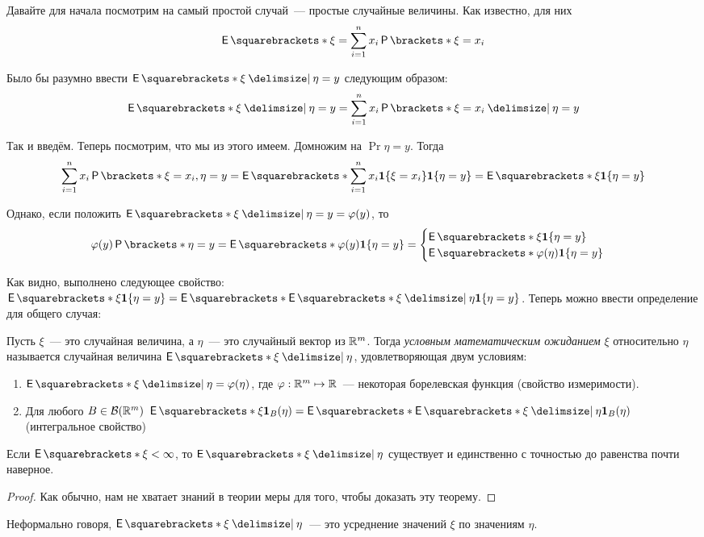Давайте для начала посмотрим на самый простой случай~--- простые случайные величины. Как известно, для них
\[
	\E{\xi} = \sum_{i = 1}^{n} x_i\Pr{\xi = x_i}
\]

Было бы разумно ввести \(\E{\xi \given \eta = y}\) следующим образом:
\[
	\E{\xi \given \eta = y} = \sum_{i = 1}^{n} x_i\Pr{\xi = x_i \given \eta = y}
\]

Так и введём. Теперь посмотрим, что мы из этого имеем. Домножим на \(\Pr{\eta = y}\). Тогда
\begin{align*}
	\sum_{i = 1}^{n} x_i\Pr{\xi = x_i, \eta = y} = \E{\sum_{i = 1}^{n} x_i\mathbf{1}\{\xi = x_i\}\mathbf{1}\{\eta = y\}} = \E{\xi\mathbf{1}\{\eta = y\}}
\end{align*}

Однако, если положить \(\E{\xi \given \eta = y} = \phi(y)\), то
\[
	\phi(y)\Pr{\eta = y} = \E{\phi(y)\mathbf{1}\{\eta = y\}} = \begin{cases}
	\E{\xi\mathbf{1}\{\eta = y\}} \\
	\E{\phi(\eta)\mathbf{1}\{\eta = y\}}
	\end{cases}
\]

Как видно, выполнено следующее свойство: \(\E{\xi\mathbf{1}\{\eta = y\}} = \E{\E{\xi \given \eta}\mathbf{1}\{\eta = y\}}\). Теперь можно ввести определение для общего случая:

\begin{definition}
	Пусть \(\xi\)~--- это случайная величина, а \(\eta\)~--- это случайный вектор из \(\mathbb{R}^{m}\). Тогда \emph{условным математическим ожиданием} \(\xi\) относительно \(\eta\) называется случайная величина \(\E{\xi \given \eta}\), удовлетворяющая двум условиям:
	\begin{enumerate}
		\item \(\E{\xi \given \eta} = \phi(\eta)\), где \(\varphi : \mathbb{R}^m \mapsto \mathbb{R}\)~--- некоторая борелевская функция (свойство измеримости).
		\item Для любого \(B \in \mathcal{B}(\mathbb{R}^m)\) \(\E{\xi\mathbf{1}_{B}(\eta)} = \E{\E{\xi \given \eta}\mathbf{1}_{B}(\eta)}\) (интегральное свойство)
	\end{enumerate}
\end{definition}

\begin{theorem}
	Если \(\E{\xi} < \infty\), то \(\E{\xi \given \eta}\) существует и единственно с точностью до равенства почти наверное.
\end{theorem}
\begin{proof}
	Как обычно, нам не хватает знаний в теории меры для того, чтобы доказать эту теорему.
\end{proof}

Неформально говоря, \(\E{\xi \given \eta}\)~--- это усреднение значений \(\xi\) по значениям \(\eta\).